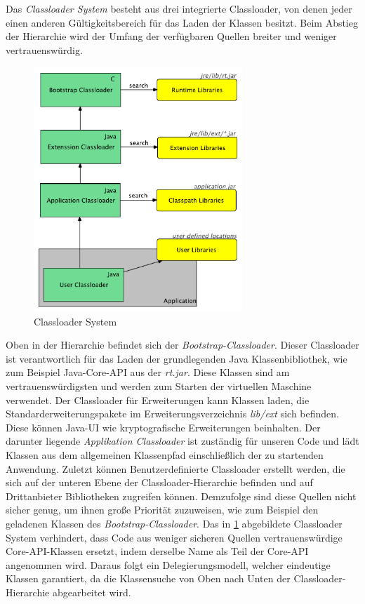     Das \textit{Classloader System} besteht aus drei integrierte Classloader, von denen jeder einen anderen Gültigkeitsbereich für das Laden der Klassen besitzt. Beim Abstieg der Hierarchie wird der Umfang der verfügbaren Quellen breiter und weniger vertrauenswürdig. 

    \begin{figure}[h!]
      \centering
      \includegraphics[width=0.7\textwidth]{material/images/Classloader-Hierarhie2.pdf}
      \caption{Classloader System \cite{classLoadingIntro}}
      \label{fig:cl}
    \end{figure}
    
    Oben in der Hierarchie befindet sich der \textit{Bootstrap-Classloader}. Dieser Classloader ist verantwortlich für das Laden der grundlegenden Java Klassenbibliothek, wie zum Beispiel Java-Core-API aus der \textit{rt.jar}. Diese Klassen sind am vertrauenswürdigsten und werden zum Starten der virtuellen Maschine verwendet. Der Classloader für Erweiterungen kann Klassen laden, die Standarderweiterungspakete im Erweiterungsverzeichnis \textit{lib/ext} sich befinden. Diese können Java-UI wie kryptografische Erweiterungen beinhalten. Der darunter liegende \textit{Applikation Classloader} ist zuständig für unseren Code und lädt Klassen aus dem allgemeinen Klassenpfad einschließlich der zu startenden Anwendung. Zuletzt können Benutzerdefinierte Classloader erstellt werden, die sich auf der unteren Ebene der Classloader-Hierarchie befinden und auf Drittanbieter Bibliotheken zugreifen können. Demzufolge sind diese Quellen nicht sicher genug, um ihnen große Priorität zuzuweisen, wie zum Beispiel den geladenen Klassen des \textit{Bootstrap-Classloader}.\bigbreak 
    Das in \ref{fig:cl} abgebildete Classloader System verhindert, dass Code aus weniger sicheren Quellen vertrauenswürdige Core-API-Klassen ersetzt, indem derselbe Name als Teil der Core-API angenommen wird. Daraus folgt ein Delegierungsmodell, welcher eindeutige Klassen garantiert, da die Klassensuche von Oben nach Unten der Classloader-Hierarchie abgearbeitet wird.  \cite{classLoadingIntro} 
    

